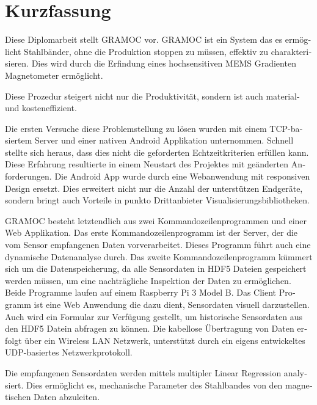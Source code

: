 \chapter{Kurzfassung}
\begin{german}

Diese Diplomarbeit stellt GRAMOC vor. GRAMOC ist ein System das es ermöglicht Stahlbänder, ohne die Produktion stoppen zu müssen, effektiv zu charakterisieren. Dies wird durch die Erfindung eines hochsensitiven MEMS Gradienten Magnetometer ermöglicht.

Diese Prozedur steigert nicht nur die Produktivität, sondern ist auch material- und kosteneffizient.

Die ersten Versuche diese Problemstellung zu lösen wurden mit einem TCP-basiertem Server und einer nativen Android Applikation unternommen. Schnell stellte sich heraus, dass dies nicht die geforderten Echtzeitkriterien erfüllen kann. Diese Erfahrung resultierte in einem Neustart des Projektes mit geänderten Anforderungen. Die Android App wurde durch eine Webanwendung mit responsiven Design ersetzt. Dies erweitert nicht nur die Anzahl der unterstützen Endgeräte, sondern bringt auch Vorteile in punkto Drittanbieter Visualisierungsbibliotheken.

GRAMOC besteht letztendlich aus zwei Kommandozeilenprogrammen und einer Web Applikation. Das erste Kommandozeilenprogramm ist der Server, der die vom Sensor empfangenen Daten vorverarbeitet. Dieses Programm führt auch eine dynamische Datenanalyse durch. Das zweite Kommandozeilenprogramm kümmert sich um die Datenspeicherung, da alle Sensordaten in HDF5 Dateien gespeichert werden müssen, um eine nachträgliche Inspektion der Daten zu ermöglichen. Beide Programme laufen auf einem Raspberry Pi 3 Model B. Das Client Programm ist eine Web Anwendung die dazu dient, Sensordaten visuell darzustellen. Auch wird ein Formular zur Verfügung gestellt, um historische Sensordaten aus den HDF5 Datein abfragen zu können. Die kabellose Übertragung von Daten erfolgt über ein Wireless LAN Netzwerk, unterstützt durch ein eigens entwickeltes UDP-basiertes Netzwerkprotokoll.

Die empfangenen Sensordaten werden mittels multipler Linear Regression analysiert. Dies ermöglicht es, mechanische Parameter des Stahlbandes von den magnetischen Daten abzuleiten.

\end{german}
